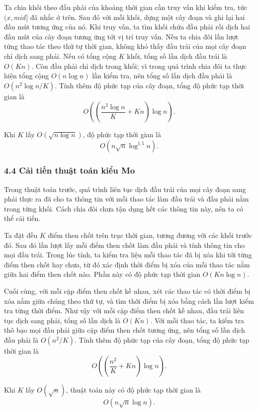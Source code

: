 \documentclass[11pt]{article}
\begin{document}
Ta chia khối theo đầu phải của khoảng thời gian cần truy vấn khi kiểm tra, tức
\((x,\mathit{mid}]\) đã nhắc ở trên. Sau đó với mỗi khối, dựng một cây đoạn và
ghi lại hai đầu mút tương ứng của nó. Khi truy vấn, ta tìm khối chứa đầu phải
rồi dịch hai đầu mút của cây đoạn tương ứng tới vị trí truy vấn. Nếu ta chia đôi
lần lượt từng thao tác theo thứ tự thời gian, không khó thấy đầu trái của mọi
cây đoạn chỉ dịch sang phải. Nếu có tổng cộng \(K\) khối, tổng số lần dịch đầu
trái là \(O(Kn)\). Còn đầu phải chỉ dịch trong khối; vì trong quá trình chia đôi
ta thực hiện tổng cộng \(O(n\log n)\) lần kiểm tra, nên tổng số lần dịch đầu
phải là \(O(n^2\log n/K)\). Tính thêm độ phức tạp của cây đoạn, tổng độ phức tạp
thời gian là
\[
  O\left(\left(\frac{n^2\log n}{K}+Kn\right)\log n\right).
\]

Khi \(K\) lấy \(O(\sqrt{n\log n})\), độ phức tạp thời gian là
\[
  O(n\sqrt n\log^{1.5}n).
\]

\subsubsection*{4.4 Cải tiến thuật toán kiểu Mo}

Trong thuật toán trước, quá trình liên tục dịch đầu trái của mọi cây đoạn sang
phải thực ra đã cho ta thông tin với mỗi thao tác làm đầu trái và đầu phải nằm
trong từng khối. Cách chia đôi chưa tận dụng hết các thông tin này, nên ta có
thể cải tiến.

Ta đặt đều \(K\) điểm then chốt trên trục thời gian, tương đương với các khối
trước đó. Sau đó lần lượt lấy mỗi điểm then chốt làm đầu phải và tính thông tin
cho mọi đầu trái. Trong lúc tính, ta kiểm tra liệu mỗi thao tác đã bị xóa khi
tới từng điểm then chốt hay chưa, từ đó xác định thời điểm bị xóa của mỗi thao
tác nằm giữa hai điểm then chốt nào. Phần này có độ phức tạp thời gian
\(O(Kn\log n)\).

Cuối cùng, với mỗi cặp điểm then chốt kề nhau, xét các thao tác có thời điểm bị
xóa nằm giữa chúng theo thứ tự, và tìm thời điểm bị xóa bằng cách lần lượt kiểm
tra từng thời điểm. Như vậy với mỗi cặp điểm then chốt kề nhau, đầu trái liên
tục dịch sang phải, tổng số lần dịch là \(O(Kn)\). Với mỗi thao tác, ta kiểm tra
thô bạo mọi đầu phải giữa cặp điểm then chốt tương ứng, nên tổng số lần dịch đầu
phải là \(O(n^2/K)\). Tính thêm độ phức tạp của cây đoạn, tổng độ phức tạp thời
gian là
\[
  O\left(\left(\frac{n^2}{K}+Kn\right)\log n\right).
\]

Khi \(K\) lấy \(O(\sqrt n)\), thuật toán này có độ phức tạp thời gian là
\[
  O(n\sqrt n\log n).
\]
\end{document}
